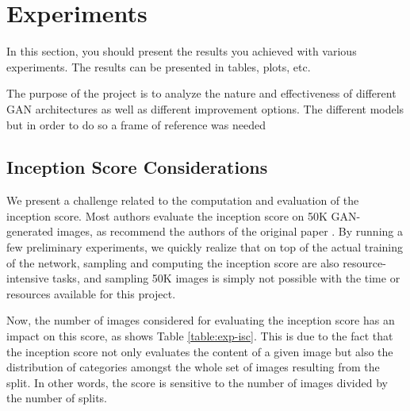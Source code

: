 
\section{Experiments} In this section, you should
present the results you achieved with various experiments. The results
can be presented in tables, plots, etc. 

The purpose of the project is to analyze the nature and effectiveness of different GAN architectures as well as different improvement options. The different models  but in order to do so a frame of reference was needed 


\subsection{Inception Score Considerations}
We present a challenge related to the computation and evaluation of the inception score. Most authors evaluate the inception score on 50K GAN-generated images, as recommend the authors of the original paper \cite{salimans2016improved}. By running a few preliminary experiments, we quickly realize that on top of the actual training of the network, sampling and computing the inception score are also resource-intensive tasks, and sampling 50K images is simply not possible with the time or resources available for this project.

Now, the number of images considered for evaluating the inception score has an impact on this score, as shows Table \ref{table:exp-isc}. This is due to the fact that the inception score not only evaluates the content of a given image but also the distribution of categories amongst the whole set of images resulting from the split. In other words, the score is sensitive to the number of images divided by the number of splits. 


